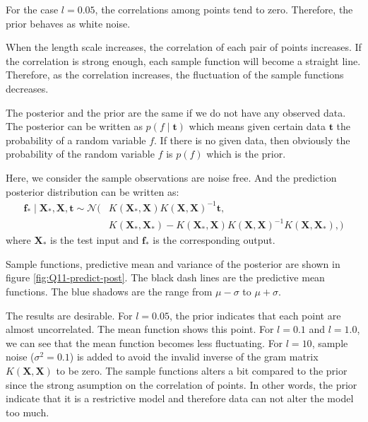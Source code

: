 \documentclass[12pt]{article}
\newenvironment{question}[2][Question]{\begin{trivlist}
\kern10pt
\item[\hskip \labelsep {\bfseries #1}\hskip \labelsep {\bfseries #2.}]}{\end{trivlist}}
\begin{document}
\begin{question}{10}
For the case $l = 0.05$, the correlations among points tend to zero. Therefore,
the prior behaves as white noise.

When the length scale increases, the correlation of each pair of points increases.
If the correlation is strong enough, each sample function will become a straight line.
Therefore, as the correlation increases, the fluctuation of the sample functions decreases.
\end{question}

\begin{question}{11}
The posterior and the prior are the same if we do not have any observed data.
The posterior can be written as $p(f\mid \mathbf{t})$ which means given certain data
$\mathbf{t}$ the probability of a random variable $f$. 
If there is no given data, then obviously
the probability of the random variable $f$ is $p(f)$ which is the prior.

Here, we consider the sample observations are noise free.
And the prediction posterior distribution can be written as:
\begin{align*}
  \mathbf{f}_{*} \mid \mathbf{X}_{*}, \mathbf{X}, \mathbf{t} \sim \mathcal{N}(&
    K(\mathbf{X}_*, \mathbf{X})K(\mathbf{X}, \mathbf{X})^{-1}\mathbf{t}, \\
    &K(\mathbf{X}_*, \mathbf{X}_*) 
      - K(\mathbf{X}_*, \mathbf{X})K(\mathbf{X}, \mathbf{X})^{-1}K(\mathbf{X}, \mathbf{X}_*),
  )
\end{align*}
where $\mathbf{X}_*$ is the test input and $\mathbf{f}_{*}$ is the corresponding output.

Sample functions, predictive mean and variance of the posterior are shown in 
figure \ref{fig:Q11-predict-post}. The black dash lines are the predictive mean
functions. The blue shadows are the range from $\mu - \sigma$ to $\mu + \sigma$.

The results are desirable. For $l = 0.05$, the prior indicates that each point 
are almost uncorrelated. The mean function shows this point. For $l = 0.1$ and $l = 1.0$,
we can see that the mean function becomes less fluctuating. For $l = 10$, sample
noise ($\sigma^2 = 0.1$) is added to avoid the invalid inverse of the gram matrix
$K(\mathbf{X}, \mathbf{X})$ to be zero. 
The sample functions alters a bit compared to the prior since the strong asumption
on the correlation of points. In other words, the prior indicate that it is a 
restrictive model and therefore data can not alter the model too much.




\end{question}
\end{document}
